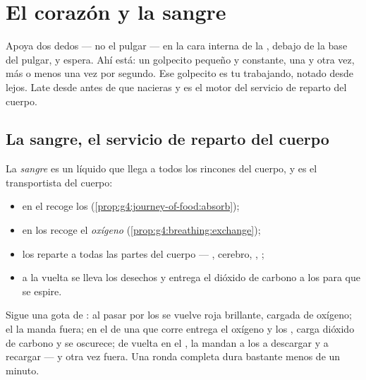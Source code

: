 \chapter{El corazón y la sangre}\label{ch:g4:heart-and-blood}

Apoya dos dedos --- no el pulgar --- en la cara interna de la ,
debajo de la base del pulgar, y espera. Ahí está: un golpecito
pequeño y constante, una y otra vez, más o menos una vez por segundo.
Ese golpecito es tu  trabajando, notado desde lejos. Late desde
antes de que nacieras y es el motor del servicio de reparto del cuerpo.

\section{La sangre, el servicio de reparto del cuerpo}

\begin{proposition}\label{prop:g4:heart-and-blood:carries}
La \emph{sangre} es un líquido que llega a todos los
rincones del cuerpo, y es el transportista del cuerpo:
\begin{itemize}
  \item en el  recoge los \emph{}
        (\cref{prop:g4:journey-of-food:absorb});
  \item en los  recoge el \emph{oxígeno}
        (\cref{prop:g4:breathing:exchange});
  \item los reparte a todas las partes del cuerpo --- ,
        cerebro, , ;
  \item a la vuelta se lleva los desechos y entrega el dióxido de
        carbono a los  para que se espire.
\end{itemize}
\end{proposition}
\admitted

\begin{example}\label{ex:g4:heart-and-blood:round}
Sigue una gota de : al pasar por los  se vuelve roja
brillante, cargada de oxígeno; el  la manda fuera; en el
 de una  que corre entrega el oxígeno y los ,
carga dióxido de carbono y se oscurece; de vuelta en el , la
mandan a los  a descargar y a recargar --- y otra vez fuera.
Una ronda completa dura bastante menos de un minuto.
\end{example}

